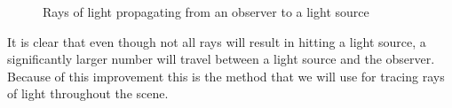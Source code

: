\documentclass[../pbr.tex]{subfile}
\begin{document}
\begin{figure}[htpb]
\begin{center}
\end{center}
\caption{Rays of light propagating from an observer to a light source}%
\label{fig:p1_observer_light_transport}
\end{figure}

It is clear that even though not all rays will result in hitting a light
source, a significantly larger number will travel between a light source and
the observer. Because of this improvement this is the method that we will use
for tracing rays of light throughout the scene.
\end{document}
